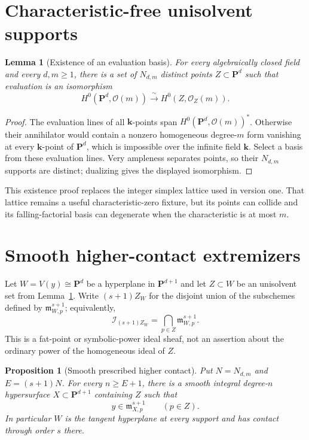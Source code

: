 \documentclass[11pt]{article}
\newtheorem{proposition}[theorem]{Proposition}
\newtheorem{lemma}[theorem]{Lemma}
\theoremstyle{definition}
\theoremstyle{remark}
\theoremstyle{plain}
\newcommand{\PP}{\mathbf P}
\newcommand{\kk}{\mathbf k}
\newcommand{\cO}{\mathcal O}
\newcommand{\cI}{\mathcal I}
\begin{document}
\section{Characteristic-free unisolvent supports}

\begin{lemma}[Existence of an evaluation basis]\label{lem:unisolvent}
For every algebraically closed field and every $d,m\geq1$, there is a set of
$N_{d,m}$ distinct points $Z\subset\PP^d$ such that evaluation is an
isomorphism
\[
 H^0(\PP^d,\cO(m))\xrightarrow{\ \sim\ }H^0(Z,\cO_Z(m)).
\]
\end{lemma}

\begin{proof}
The evaluation lines of all $\kk$-points span
$H^0(\PP^d,\cO(m))^*$.  Otherwise their annihilator would contain a nonzero
homogeneous degree-$m$ form vanishing at every $\kk$-point of $\PP^d$,
which is impossible over the infinite field $\kk$.  Select a basis from
these evaluation lines.  Very ampleness separates points, so their
$N_{d,m}$ supports are distinct; dualizing gives the displayed isomorphism.
\end{proof}

This existence proof replaces the integer simplex lattice used in version
one.  That lattice remains a useful characteristic-zero fixture, but its
points can collide and its falling-factorial basis can degenerate when the
characteristic is at most $m$.

\section{Smooth higher-contact extremizers}

Let $W=V(y)\cong\PP^d$ be a hyperplane in $\PP^{d+1}$ and let
$Z\subset W$ be an unisolvent set from Lemma~\ref{lem:unisolvent}.  Write
$(s+1)Z_W$ for the disjoint union of the subschemes defined by
$\mathfrak m_{W,p}^{s+1}$; equivalently,
\[
 \cI_{(s+1)Z_W}=\bigcap_{p\in Z}\mathfrak m_{W,p}^{s+1}.
\]
This is a fat-point or symbolic-power ideal sheaf, not an assertion about
the ordinary power of the homogeneous ideal of $Z$.

\begin{proposition}[Smooth prescribed higher contact]
\label{prop:higher-contact}
Put $N=N_{d,m}$ and $E=(s+1)N$.  For every $n\geq E+1$, there is a smooth
integral degree-$n$ hypersurface $X\subset\PP^{d+1}$ containing $Z$ such
that
\[
 y\in\mathfrak m_{X,p}^{s+1}\qquad(p\in Z).
\]
In particular $W$ is the tangent hyperplane at every support and has contact
through order $s$ there.
\end{proposition}
\end{document}
